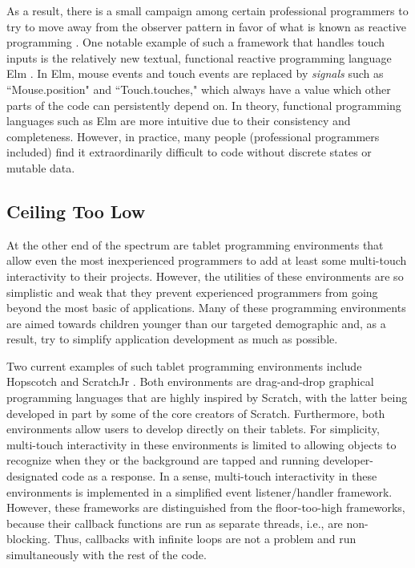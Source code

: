 As a result, there is a small campaign among certain professional programmers to try to move away from the observer pattern in favor of what is known as reactive programming \cite{Maier, vanderPloeg}. One notable example of such a framework that handles touch inputs is the relatively new textual, functional reactive programming language Elm \cite{Elm}. In Elm, mouse events and touch events are replaced by \emph{signals} such as ``Mouse.position" and ``Touch.touches," which always have a value which other parts of the code can persistently depend on. In theory, functional programming languages such as Elm are more intuitive due to their consistency and completeness. However, in practice, many people (professional programmers included) find it extraordinarily difficult to code without discrete states or mutable data.

\subsection{Ceiling Too Low}
At the other end of the spectrum are tablet programming environments that allow even the most inexperienced programmers to add at least some multi-touch interactivity to their projects. However, the utilities of these environments are so simplistic and weak that they prevent experienced programmers from going beyond the most basic of applications. Many of these programming environments are aimed towards children younger than our targeted demographic and, as a result, try to simplify application development as much as possible. 

Two current examples of such tablet programming environments include Hopscotch \cite{Hopscotch} and ScratchJr \cite{ScratchJr}. Both environments are drag-and-drop graphical programming languages that are highly inspired by Scratch, with the latter being developed in part by some of the core creators of Scratch. Furthermore, both environments allow users to develop directly on their tablets. For simplicity, multi-touch interactivity in these environments is limited to allowing objects to recognize when they or the background are tapped and running developer-designated code as a response. In a sense, multi-touch interactivity in these environments is implemented in a simplified event listener/handler framework. However, these frameworks are distinguished from the floor-too-high frameworks, because their callback functions are run as separate threads, i.e., are non-blocking. Thus, callbacks with infinite loops are not a problem and run simultaneously with the rest of the code.

